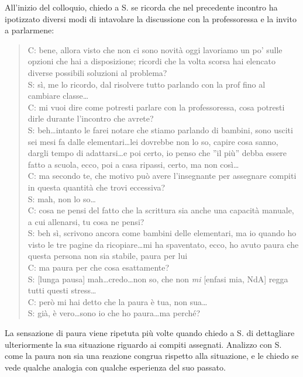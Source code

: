 All'inizio del colloquio, chiedo a S. se ricorda che nel precedente incontro ha ipotizzato diversi modi di intavolare la discussione con la professoressa e la invito a parlarmene:
\begin{verse}
C: bene, allora visto che non ci sono novità oggi lavoriamo un po' sulle opzioni che hai a disposizione; ricordi che la volta scorsa hai elencato  diverse possibili soluzioni al problema?\\
S: sì, me lo ricordo, dal risolvere tutto parlando con la prof fino al cambiare classe\ldots\\
C: mi vuoi dire come potresti parlare con la professoressa, cosa potresti dirle durante l'incontro che avrete?\\
S: beh\ldots{}intanto le farei notare che stiamo parlando di bambini, sono usciti sei mesi fa dalle elementari\ldots{}lei dovrebbe non lo so, capire cosa sanno, dargli tempo di adattarsi\ldots{}e poi certo, io penso che ''il più'' debba essere fatto a scuola, ecco, poi a casa ripassi, certo, ma non così\ldots\\
C: ma secondo te, che motivo può avere l'insegnante per assegnare compiti in questa quantità che trovi eccessiva?\\
S: mah, non lo so\ldots\\
C: cosa ne pensi del fatto che la scrittura sia anche una capacità manuale, a cui allenarsi, tu cosa ne pensi?\\
S: beh sì, scrivono ancora come bambini delle elementari, ma io quando ho visto le tre pagine da ricopiare\ldots{}mi ha spaventato, ecco, ho avuto paura che questa persona non sia stabile, paura per lui\\
C: ma paura per che cosa esattamente?\\
S: [lunga pausa] mah\ldots{}credo\ldots{}non so, che non \emph{mi} [enfasi mia, NdA] regga tutti questi stress\ldots\\
C: però mi hai detto che la paura è tua, non sua\ldots\\
S: già, è vero\ldots{}sono io che ho paura\ldots{}ma perché?\\
\end{verse}

\noindent La sensazione di paura viene ripetuta più volte quando chiedo a S. di dettagliare ulteriormente la sua situazione riguardo ai compiti assegnati. Analizzo con S. come la paura non sia una reazione congrua rispetto alla situazione, e le chiedo se vede qualche analogia con qualche esperienza del suo passato.

